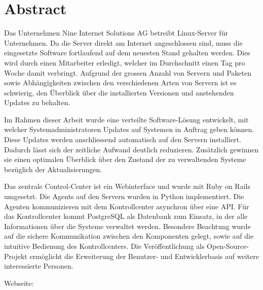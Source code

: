 \begin{comment}
2.1.2 Abstract
Ein Abstract ist eine rein textuelle kurze Zusammenfassung der Arbeit. Der Abstract ist für die Recherche in grossen Dokumentensammlungen geeignet. Er umfasst nie mehr als eine Seite, typisch sogar nur etwa 200 Worte (etwa 20 Zeilen).
Der Begriff ‚Kurzfassung’ ist zuwenig genau definiert; er soll wenn möglich vermieden werden.


“Der Abstract richtet sich an den Spezialisten auf dem entsprechenden Gebiet und beschreibt daher in erster Linie die (neuen, eigenen) Ergebnisse und Resultate der Arbeit. Es umfasst nie mehr als eine Seite, typisch sogar nur etwa 200 Worte (etwa 20 Zeilen). Es sind keine Bilder zu verwenden.” (Anleitung: Dokumentation Studien- und Bachelorarbeiten)

Offene Fragen:
- Mehr zur Umsetzung?
- Nutzen für den obigen Mitarbeiter? Zeitersparnis, Überblick?

\end{comment}

{}
\chapter*{Abstract}

Das Unternehmen Nine Internet Solutions AG betreibt Linux-Server für Unternehmen. Da die Server direkt am Internet angeschlossen sind, muss die eingesetzte Software fortlaufend auf dem neuesten Stand gehalten werden. Dies wird durch einen Mitarbeiter erledigt, welcher im Durchschnitt einen Tag pro Woche damit verbringt. Aufgrund der grossen Anzahl von Servern und Paketen sowie Abhängigkeiten zwischen den verschiedenen Arten von Servern ist es schwierig, den Überblick über die installierten Versionen und anstehenden Updates zu behalten.

Im Rahmen dieser Arbeit wurde eine verteilte Software-Lösung entwickelt, mit welcher Systemadministratoren Updates auf Systemen in Auftrag geben können. Diese Updates werden anschliessend automatisch auf den Servern installiert. Dadurch lässt sich der zeitliche Aufwand deutlich reduzieren. Zusätzlich gewinnen sie einen optimalen Überblick über den Zustand der zu verwaltenden Systeme bezüglich der Aktualisierungen.

Das zentrale Control-Center ist ein Webinterface und wurde mit Ruby on Rails umgesetzt. Die Agents auf den Servern wurden in Python implementiert. Die Agenten kommunizieren mit dem Kontrollcenter asynchron über eine API. Für das Kontrollcenter kommt PostgreSQL als Datenbank zum Einsatz, in der alle Informationen über die Systeme verwaltet werden. Besondere Beachtung wurde auf die sichere Kommunikation zwischen den Komponenten gelegt, sowie auf die intuitive Bedienung des Kontrollcenters. Die Veröffentlichung als Open-Source-Projekt ermöglicht die Erweiterung der Benutzer- und Entwicklerbasis auf weitere interessierte Personen.

\bigskip
Webseite: 

\glsresetall

